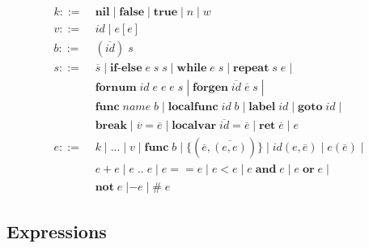 \documentclass[12pt]{article}
\newcommand{\pipe}{\;|\;}
\begin{document}
\begin{align*}
k ::= \; & \mathbf{nil} \pipe \mathbf{false} \pipe \mathbf{true}
\pipe n \pipe w\\ 
v ::= \; & id \pipe e[e]\\
b ::= \; & (\overline{id}) \; s\\
s ::= \; & \overline{s} \pipe \textbf{if-else} \; e \; s \; s
\pipe \textbf{while} \; e \; s \pipe \textbf{repeat} \; s \; e \pipe\\
& \textbf{fornum} \; id \; e \; e \; e \; s 
\pipe \textbf{forgen} \; \overline{id} \; \overline{e} \; s \pipe\\
& \textbf{func} \; name \; b \pipe \textbf{localfunc} \; id \; b
\pipe \textbf{label} \; id \pipe \textbf{goto} \; id \pipe\\
& \textbf{break} \pipe \overline{v} = \overline{e}
\pipe \textbf{localvar} \; \overline{id} = \overline{e}
\pipe \textbf{ret} \; \overline{e} \pipe e\\
e ::= \; & k \pipe {...} \pipe v \pipe \mathbf{func} \; b
\pipe \{(\overline{e},\overline{(e,e)})\}
\pipe id(e,\overline{e}) \pipe e(\overline{e}) \pipe\\
& e + e \pipe e \; {..} \; e \pipe e == e \pipe e < e
\pipe e \; \mathbf{and} \; e \pipe e \; \mathbf{or} \; e \pipe\\
& \mathbf{not} \; e \; | - e \pipe \# \; e
\end{align*}

\subsection{Expressions}
\end{document}
